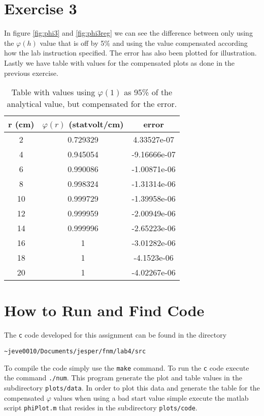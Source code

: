 \documentclass[11pt]{article}
\newif\iftikz
\begin{document}
\section{Exercise 3}
In figure \ref{fig:phi3} and \ref{fig:phi3reg} we can see the difference between only using the  $\varphi(h)$ value that is off by 5\% and using the value compensated according how the lab instruction specified. The error has also been plotted for illustration. Lastly we have table with values for the compensated plots as done in the previous exercise.
\iftikz
\begin{figure}[H]
	\centering
	\newlength\figureheight 
	\newlength\figurewidth
	\setlength\figureheight{7cm} 
	\setlength\figurewidth{14cm}
	
	\caption{Showing the value for $\varphi$ when $\varphi(h)$ was off by 5\%.}
	\label{fig:phi3}
\end{figure}
\fi
\iftikz
\begin{figure}[H]
	\centering
	\setlength\figureheight{7cm} 
	\setlength\figurewidth{14cm}
	
	\caption{Showing the compensated $\varphi$.}
	\label{fig:phi3reg}
\end{figure}
\fi

\begin{table}[h]
\center
\caption{Table with values using $\varphi(1)$ as 95\% of the analytical value, but compensated for the error.}
\begin{tabular}{c|c|c}
r (cm) & $\varphi(r)$ (statvolt/cm) & error \\ \hline
2 & 0.729329 & 4.33527e-07 \\ \hline
4 & 0.945054 & -9.16666e-07 \\ \hline
6 & 0.990086 & -1.00871e-06 \\ \hline
8 & 0.998324 & -1.31314e-06 \\ \hline
10 & 0.999729 & -1.39958e-06 \\ \hline
12 & 0.999959 & -2.00949e-06 \\ \hline
14 & 0.999996 & -2.65223e-06 \\ \hline
16 & 1 & -3.01282e-06 \\ \hline
18 & 1 & -4.1523e-06 \\ \hline
20 & 1 & -4.02267e-06 \\ 
\end{tabular}
\end{table}
\newpage
\section{How to Run and Find Code}
The \verb+c+ code developed for this assignment can be found in the directory
\begin{verbatim}
~jeve0010/Documents/jesper/fnm/lab4/src
\end{verbatim}
To compile the code simply use the \verb+make+ command. To run the \verb+c+ code execute the command \verb+./num+. This program generate the plot and table values in the subdirectory \verb+plots/data+. In order to plot this data and generate the table for the compensated $\varphi$ values when using a bad start value simple execute the matlab script \verb+phiPlot.m+ that resides in the subdirectory \verb+plots/code+. 
\end{document}
